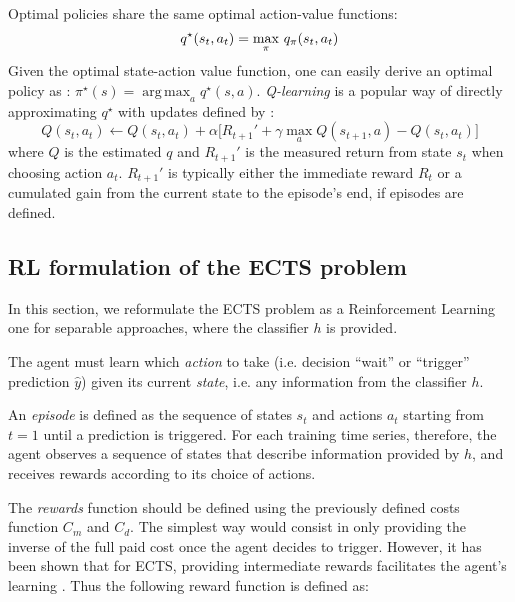 \documentclass[sigconf, nonacm, table]{acmart}
\DeclareMathOperator*{\argmax}{arg\,max}
\begin{document}
Optimal policies share the same optimal action-value functions:
\begin{equation}
    q^\star(s_t, a_t) = \operatornamewithlimits{max}_\pi \, q_\pi(s_t,a_t)
\end{equation}
 Given the optimal state-action value function, one can easily derive an optimal policy as : $\pi^\star(s) = \argmax_{a} q^\star(s,a)$. \textit{Q-learning} \cite{dayan1992q} is a popular way of directly approximating $q^{\star}$ with updates defined by :
\begin{equation}
    Q(s_t, a_t) \xleftarrow{}Q(s_t,a_t) + \alpha \bigl[ R_{t+1}' + \gamma \max_a Q(s_{t+1}, a) - Q(s_t, a_t) \bigr]
    \label{eq_Q_learning}
\end{equation}
where $Q$ is the estimated $q$ and $R_{t+1}'$ is the measured return from state $s_t$ when choosing action $a_t$. $R_{t+1}'$ is typically either the immediate reward $R_t$ or a cumulated gain from the current state to the episode's end, if episodes are defined.



\subsection{RL formulation of the ECTS problem}
\label{sec_RL_for_ECTS}

In this section, we reformulate the ECTS problem as a Reinforcement Learning one for separable approaches, where the classifier $h$ is provided. 

The agent must learn which \textit{action} to take (i.e. decision ``wait'' or ``trigger'' prediction $\hat{y}$)  given its current \textit{state}, i.e. any information from the classifier $h$. 

An \textit{episode} is defined as the sequence of states $s_t$ and actions $a_t$ starting from $t=1$ until a prediction is triggered. For each training time series, therefore, the agent observes a sequence of states that describe information provided by $h$, and receives rewards according to its choice of actions. 





The \textit{rewards} function should be defined using the previously defined costs function $C_m$ and $C_d$. The simplest way would consist in only providing the inverse of the full paid cost once the agent decides to trigger. However, it has been shown that for ECTS, providing intermediate rewards facilitates the agent's learning \cite{martinez2020adaptive}. Thus the following reward function is defined as: 
\end{document}
